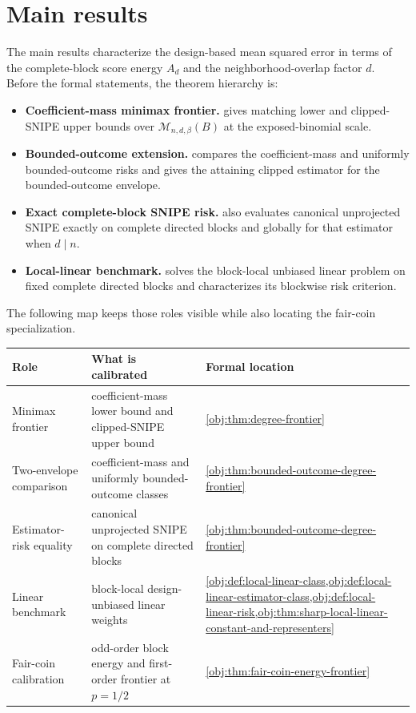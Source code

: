 \documentclass[11pt]{article}
\begin{document}
\section{Main results}

The main results characterize the design-based mean squared error in terms of the complete-block score energy \(A_d\) and the neighborhood-overlap factor \(d\). Before the formal statements, the theorem hierarchy is:
\begin{itemize}
\item \textbf{Coefficient-mass minimax frontier.}  gives matching lower and clipped-SNIPE upper bounds over \(\mathcal M_{n,d,\beta}(B)\) at the exposed-binomial scale.
\item \textbf{Bounded-outcome extension.}  compares the coefficient-mass and uniformly bounded-outcome risks and gives the attaining clipped estimator for the bounded-outcome envelope.
\item \textbf{Exact complete-block SNIPE risk.}  also evaluates canonical unprojected SNIPE exactly on complete directed blocks and globally for that estimator when \(d\mid n\).
\item \textbf{Local-linear benchmark.}  solves the block-local unbiased linear problem on fixed complete directed blocks and characterizes its blockwise risk criterion.
\end{itemize}

The following map keeps those roles visible while also locating the fair-coin specialization.
\begin{center}
\begin{tabular}{p{}p{}p{}}
\textbf{Role} & \textbf{What is calibrated} & \textbf{Formal location}\\
\hline
Minimax frontier & coefficient-mass lower bound and clipped-SNIPE upper bound & \cref{obj:thm:degree-frontier}\\
Two-envelope comparison & coefficient-mass and uniformly bounded-outcome classes & \cref{obj:thm:bounded-outcome-degree-frontier}\\
Estimator-risk equality & canonical unprojected SNIPE on complete directed blocks & \cref{obj:thm:bounded-outcome-degree-frontier}\\
Linear benchmark & block-local design-unbiased linear weights & \cref{obj:def:local-linear-class,obj:def:local-linear-estimator-class,obj:def:local-linear-risk,obj:thm:sharp-local-linear-constant-and-representers}\\
Fair-coin calibration & odd-order block energy and first-order frontier at \(p=1/2\) & \cref{obj:thm:fair-coin-energy-frontier}
\end{tabular}
\end{center}
\end{document}

